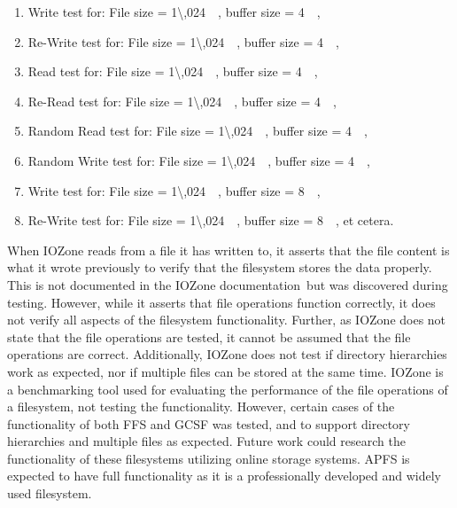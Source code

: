 \begin{enumerate}
	\item Write test for: File size = \SI{1\,024}{\kilo\byte}, buffer size = \SI{4}{\kilo\byte},
	\item \mbox{Re-Write} test for: File size = \SI{1\,024}{\kilo\byte}, buffer size = \SI{4}{\kilo\byte},
	\item Read test for: File size = \SI{1\,024}{\kilo\byte}, buffer size = \SI{4}{\kilo\byte},
	\item \mbox{Re-Read} test for: File size = \SI{1\,024}{\kilo\byte}, buffer size = \SI{4}{\kilo\byte},
	\item Random Read test for: File size = \SI{1\,024}{\kilo\byte}, buffer size = \SI{4}{\kilo\byte},
	\item Random Write test for: File size = \SI{1\,024}{\kilo\byte}, buffer size = \SI{4}{\kilo\byte},
	\item Write test for: File size = \SI{1\,024}{\kilo\byte}, buffer size = \SI{8}{\kilo\byte},
	\item \mbox{Re-Write} test for: File size = \SI{1\,024}{\kilo\byte}, buffer size = \SI{8}{\kilo\byte}, et cetera.
\end{enumerate}

When IOZone reads from a file it has written to, it asserts that the file content is what it wrote previously to verify that the filesystem stores the data properly. This is not documented in the IOZone documentation\,\cite{iozoneIozoneFilesystemBenchmark} but was discovered during testing. However, while it asserts that file operations function correctly, it does not verify all aspects of the filesystem functionality. Further, as IOZone does not state that the file operations are tested, it cannot be assumed that the file operations are correct. Additionally, IOZone does not test if directory hierarchies work as expected, nor if multiple files can be stored at the same time. IOZone is a benchmarking tool used for evaluating the performance of the file operations of a filesystem, not testing the functionality. However, certain cases of the functionality of both \gls{FFS} and \gls{GCSF} was tested, and to support directory hierarchies and multiple files as expected. Future work could research the functionality of these filesystems utilizing online storage systems. \gls{APFS} is expected to have full functionality as it is a professionally developed and widely used filesystem.

